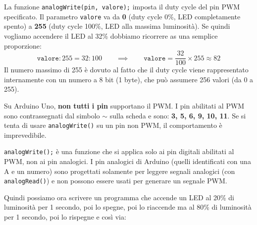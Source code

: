 La funzione \texttt{analogWrite(pin, valore);} imposta il duty cycle del pin PWM specificato. Il parametro \texttt{valore} va da \textbf{0} (duty cycle 0\%, LED completamente spento) a \textbf{255} (duty cycle 100\%, LED alla massima  luminosità). Se quindi vogliamo accendere il LED al 32\% dobbiamo ricorrere as una semplice proporzione:
\begin{equation}
    \texttt{valore} : 255 = 32 : 100 \qquad \implies \qquad \texttt{valore} = \frac{32}{100} \times 255 \approx 82
\end{equation}
Il numero massimo di 255 è dovuto al fatto che il duty cycle viene rappresentato internamente con un numero a 8 bit (1 byte), che può assumere 256 valori (da 0 a 255).
\begin{tcolorbox}[colback=orange!4, colframe=orange!70, title=\textbf{Quali pin supportano il PWM?}]
    Su Arduino Uno, \textbf{non tutti i pin} supportano il PWM. I pin abilitati al PWM sono contrassegnati dal simbolo \textbf{$\sim$} sulla scheda e sono: \textbf{3, 5, 6, 9, 10, 11}. Se si tenta di usare \texttt{analogWrite()} su un pin non PWM, il comportamento è imprevedibile.
\end{tcolorbox}
\begin{tcolorbox}[colback=red!4, colframe=red!60, title=\textbf{analogWrite non vuol dire pin analogico!}]
    \texttt{analogWrite();} è una funzione che si applica solo ai pin digitali abilitati al PWM, non ai pin analogici. I pin analogici di Arduino (quelli identificati con una A e un numero) sono progettati solamente per leggere segnali analogici (con \texttt{analogRead()}) e non possono essere usati per generare un segnale PWM.
\end{tcolorbox}



Quindi possiamo ora scrivere un programma che accende un LED al 20\% di luminosità per 1 secondo, poi lo spegne, poi lo riaccende ma al 80\% di luminosità per 1 secondo, poi lo rispegne e così via:

